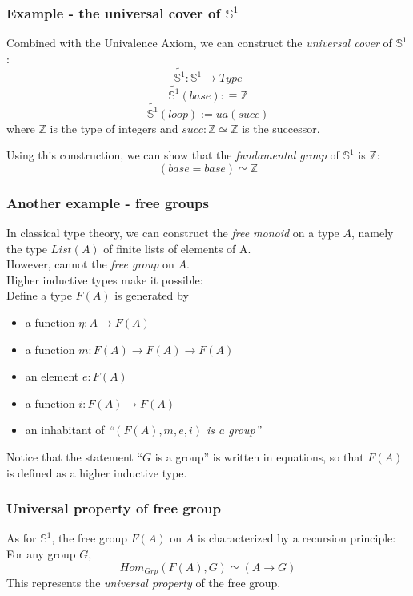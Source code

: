 \documentclass[dvipdfmx]{beamer}
\begin{document}
\begin{frame}
  \frametitle{Example - the universal cover of ${\mathbb S}^1$}
  Combined with the Univalence Axiom,
  we can construct the {\it universal cover} of ${\mathbb S}^1$:
  \[
    \widetilde{ {\mathbb S}^1 } : {\mathbb S}^1 \to Type
  \]
  \[
    \widetilde{ {\mathbb S}^1 } \left( base \right) :\equiv {\mathbb Z}
  \]
  \[
    \widetilde{ {\mathbb S}^1 } \left( loop \right) := ua \left( succ \right)
  \]
  where ${\mathbb Z}$ is the type of integers
  and $succ : {\mathbb Z} \simeq {\mathbb Z}$ is the successor.

  Using this construction, we can show that
  the {\it fundamental group} of ${\mathbb S}^1$ is ${\mathbb Z}$:
  \[
    \left( base = base \right) \simeq {\mathbb Z}
  \]
\end{frame}

\begin{frame}
  \frametitle{Another example - free groups}
  In classical type theory,
  we can construct the {\it free monoid} on a type $A$,
  namely the type $List \left( A \right)$ of finite lists
  of elements of A.
  \\
  However, cannot the {\it free group} on $A$.
  \\
  Higher inductive types make it possible:
  \\
  Define a type $F \left( A \right)$ is generated by
  \begin{itemize}
    \item a function $\eta : A \to F \left( A \right)$
    \item a function $m : F \left( A \right) \to
      F \left( A \right) \to F \left( A \right)$
    \item an element $e : F \left( A \right)$
    \item a function $i : F \left( A \right) \to F \left( A \right)$
    \item an inhabitant of
      {\it ``$\left( F \left( A \right) , m , e , i \right)$ is a group''}
  \end{itemize}
  Notice that the statement ``$G$ is a group''
  is written in equations, so that
  $F \left( A \right)$ is defined as a higher inductive type.
\end{frame}

\begin{frame}
  \frametitle{Universal property of free group}
  As for ${\mathbb S}^1$,
  the free group $F \left( A \right)$ on $A$
  is characterized by a recursion principle:
  \\
  For any group $G$,
  \[
    Hom_{Grp} \left( F \left( A \right) , G \right)
    \simeq
    \left( A \to G \right)
  \]
  This represents the {\it universal property}
  of the free group.
\end{frame}
\end{document}
